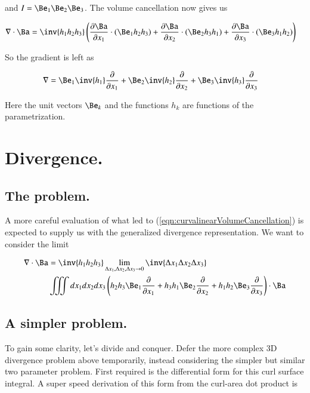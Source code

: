 and $I = \Be_1 \Be_2 \Be_3$.  The volume cancellation now gives us

\begin{align}\label{eqn:curvalinearVolumeCancellation}
\grad \cdot \Ba &=
\inv{h_1 h_2 h_3} \left(
  \PD{x_1}{\Ba} \cdot (\Be_1 h_2 h_3 )
+ \PD{x_2}{\Ba} \cdot (\Be_2 h_3 h_1 )
+ \PD{x_3}{\Ba} \cdot (\Be_3 h_1 h_2 )  \right)
\end{align}

So the gradient is left as

\begin{align}\label{eqn:gradientCurva}
\grad &=
 \Be_1 \inv{h_1} \PD{x_1}{}
+\Be_2 \inv{h_2} \PD{x_2}{}
+\Be_3 \inv{h_3} \PD{x_3}{}
\end{align}

Here the unit vectors $\Be_k$ and the functions $h_k$ are functions of the parametrization.

\section{Divergence.}

\subsection{The problem.}

A more careful evaluation of what led to (\ref{eqn:curvalinearVolumeCancellation}) is expected to supply us with the generalized divergence representation.  We want to consider the limit

\begin{align*}
\grad \cdot \Ba &= 
\inv{h_1 h_2 h_3}
\lim_{
\Delta x_1, \Delta x_2, \Delta x_3 \rightarrow 0}
\inv{\Delta x_1 \Delta x_2 \Delta x_3
} \\
&\iiint dx_1 dx_2 dx_3 \left(
h_2 h_3 \Be_1 \PD{x_1}{}
+h_3 h_1 \Be_2 \PD{x_2}{}
+h_1 h_2 \Be_3 \PD{x_3}{} \right) \cdot \Ba
\end{align*}

\subsection{A simpler problem.}

To gain some clarity, let's divide and conquer.  Defer the more complex 3D divergence problem above temporarily, instead considering the simpler but similar two parameter problem.  First required is the differential form for this curl surface integral.  A super speed derivation of this form from the curl-area dot product is

